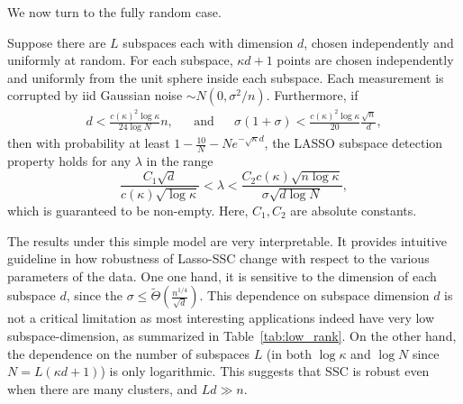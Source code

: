 \documentclass{ctexart}
\begin{document}
We now turn to the fully random case.
\begin{theorem}\label{thm:fullrandom}
Suppose there are $L$ subspaces each with dimension $d$, chosen independently and uniformly at random. For each subspace, $\kappa d+1$ points are chosen independently and uniformly from the unit sphere inside each subspace. Each measurement is corrupted by iid Gaussian noise $\sim N(0,\sigma^2/n)$. Furthermore, if
\begin{align*}
  d < \frac{c(\kappa)^2\log\kappa}{24\log N} n, &&\text{and} && \sigma(1+\sigma) < \frac{c(\kappa)^2\log \kappa  }{20}\frac{\sqrt{n} }{d},
\end{align*}
then with probability at least $1-\frac{10}{N}-Ne^{-\sqrt{\kappa}d}$, the LASSO subspace detection property holds for any $\lambda$ in the range
\begin{equation}\label{eq:thm_rand_lambda_range}
  \frac{C_1\sqrt{d}}{c(\kappa)\sqrt{\log \kappa}}<\lambda <  \frac{C_2c(\kappa)\sqrt{n\log\kappa}}{\sigma\sqrt{d\log N}},
\end{equation}
which is guaranteed to be non-empty. Here, $C_1,C_2$ are absolute constants.
\end{theorem}
The results under this simple model are very interpretable. It
 provides intuitive guideline in how robustness of Lasso-SSC change with respect to the various parameters of the data.
 One one hand, it is sensitive to the dimension of each subspace $d$, since the $\sigma \leq \tilde{\Theta}(\frac{n^{1/4}}{\sqrt{d}})$. This dependence on subspace dimension $d$ is not a critical limitation as most interesting applications indeed have very low subspace-dimension, as summarized in Table~\ref{tab:low_rank}.
On the other hand, the dependence on the number of subspaces $L$ (in both $\log\kappa$ and $\log N$ since $N=L(\kappa d+1)$) is only logarithmic.  This suggests that SSC is robust even when there are many clusters, and $Ld\gg n$.




%
\end{document}
